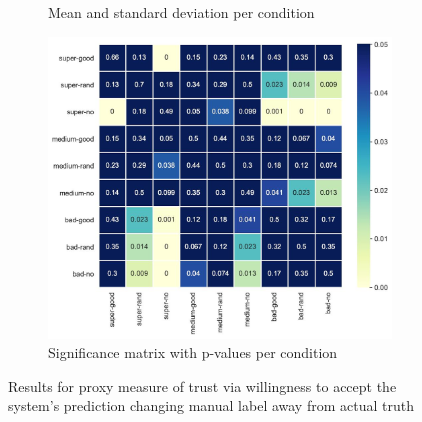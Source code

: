 \begin{figure}[H]
	\begin{subfigure}[b]{0.3\textwidth}
		\caption{Mean and standard deviation per condition}
		\label{tab:results_table_proxy_away}
	\end{subfigure}
	\begin{subfigure}[b]{0.65\textwidth}
		\includegraphics[width=\textwidth]{img/results_matrix_proxy_away2.JPG}
		\caption{Significance matrix with p-values per condition}
		\label{fig:results_matrix_proxy_away}
	\end{subfigure}
	\caption{Results for proxy measure of trust via willingness to accept the system's prediction changing manual label away from actual truth}
	\label{fig:results_proxy_away}
\end{figure}
